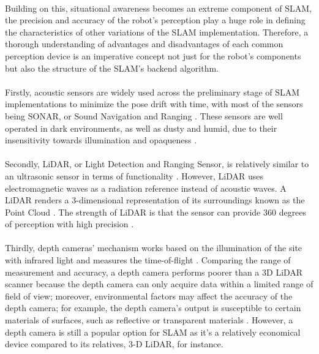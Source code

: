 \paragraph*{}
Building on this, situational awareness becomes an extreme component of SLAM, the precision and accuracy of the robot's perception play a huge role in defining the characteristics of other variations of the SLAM implementation. Therefore, a thorough understanding of advantages and disadvantages of each common perception device is an imperative concept not just for the robot’s components but also the structure of the SLAM’s backend algorithm. 

\paragraph*{}
Firstly, acoustic sensors are widely used across the preliminary stage of SLAM implementations to minimize the pose drift with time, with most of the sensors being SONAR, or Sound Navigation and Ranging \cite{udugama2023evolution}. These sensors are well operated in dark environments, as well as dusty and humid, due to their insensitivity towards illumination and opaqueness \cite{sahoo2019advancements}. 

\paragraph*{}
Secondly, LiDAR, or Light Detection and Ranging Sensor, is relatively similar to an ultrasonic sensor in terms of functionality \cite{udugama2023evolution}. However, LiDAR uses electromagnetic waves as a radiation reference instead of acoustic waves. A LiDAR renders a 3-dimensional representation of its surroundings known as the Point Cloud \cite{bisheng2017progress}. The strength of LiDAR is that the sensor can provide 360 degrees of perception with high precision \cite{cadena2016past}.

\paragraph*{}
Thirdly, depth cameras' mechanism works based on the illumination of the site with infrared light and measures the time-of-flight \cite{langmann2012depth}. Comparing the range of measurement and accuracy, a depth camera performs poorer than a 3D LiDAR scanner because the depth camera can only acquire data within a limited range of field of view; moreover, environmental factors may affect the accuracy of the depth camera; for example, the depth camera’s output is susceptible to certain materials of surfaces, such as reflective or transparent materials \cite{peng2023depth}. However, a depth camera is still a popular option for SLAM as it's a relatively economical device compared to its relatives, 3-D LiDAR, for instance.

